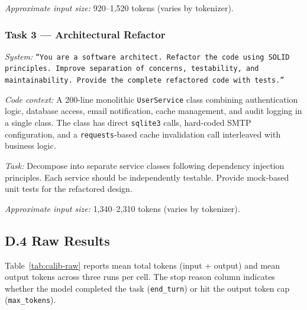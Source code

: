 \documentclass{article}
\begin{document}
\textit{Approximate input size:} 920--1{,}520 tokens (varies by tokenizer).

\subsubsection*{Task 3 --- Architectural Refactor}

\textit{System:} \texttt{``You are a software architect. Refactor the code using SOLID
principles. Improve separation of concerns, testability, and maintainability. Provide
the complete refactored code with tests.''}

\textit{Code context:} A 200-line monolithic \texttt{UserService} class combining
authentication logic, database access, email notification, cache management, and audit
logging in a single class. The class has direct \texttt{sqlite3} calls, hard-coded SMTP
configuration, and a \texttt{requests}-based cache invalidation call interleaved with
business logic.

\textit{Task:} Decompose into separate service classes following dependency injection
principles. Each service should be independently testable. Provide mock-based unit tests
for the refactored design.

\textit{Approximate input size:} 1{,}340--2{,}310 tokens (varies by tokenizer).

\subsection*{D.4 Raw Results}

Table~\ref{tab:calib-raw} reports mean total tokens (input + output) and mean output tokens
across three runs per cell. The stop reason column indicates whether the model completed
the task (\texttt{end\_turn}) or hit the output token cap (\texttt{max\_tokens}).
\end{document}
